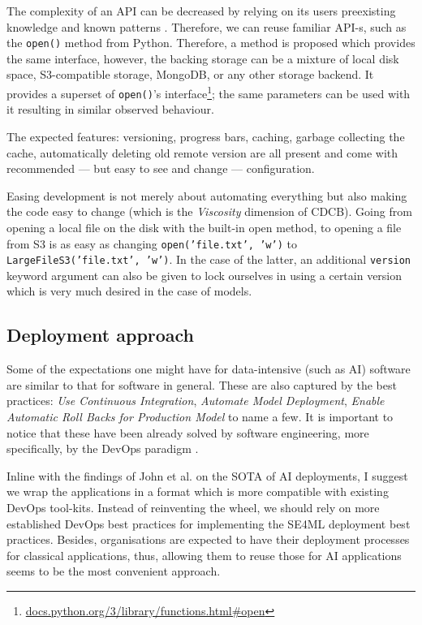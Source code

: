 The complexity of an API can be decreased by relying on its users preexisting knowledge and known patterns \cite{hermans2021programmer,ousterhout2018philosophy}. Therefore, we can reuse familiar API-s, such as the \texttt{open()} method from Python. Therefore, a method is proposed which provides the same interface, however, the backing storage can be a mixture of local disk space, S3-compatible storage, MongoDB, or any other storage backend. It provides a superset of \texttt{open()}'s interface\footnote{\href{https://docs.python.org/3/library/functions.html\#open}{docs.python.org/3/library/functions.html\#open}}; the same parameters can be used with it resulting in similar observed behaviour.

The expected features: versioning, progress bars, caching, garbage collecting the cache, automatically deleting old remote version are all present and come with recommended --- but easy to see and change --- configuration.

Easing development is not merely about automating everything but also making the code easy to change (which is the \textit{Viscosity} dimension of CDCB). Going from opening a local file on the disk with the built-in open method, to opening  a file from S3 is as easy as changing \texttt{open('file.txt', 'w')} to \texttt{LargeFileS3('file.txt', 'w')}. In the case of the latter, an additional \texttt{version} keyword argument can also be given to lock ourselves in using a certain version which is very much desired in the case of models.

\subsection{Deployment approach}

Some of the expectations one might have for data-intensive (such as AI) software are similar to that for software in general. These are also captured by the best practices: \textit{Use Continuous Integration}, \textit{Automate Model Deployment}, \textit{Enable Automatic Roll Backs for Production Model} to name a few. It is important to notice that these have been already solved by software engineering, more specifically, by the DevOps paradigm \cite{leite2019survey}. 

Inline with the findings of John et al. \cite{john2020architecting} on the SOTA of AI deployments, I suggest we wrap the applications in a format which is more compatible with existing DevOps tool-kits. Instead of reinventing the wheel, we should rely on more established DevOps best practices for implementing the SE4ML deployment best practices. Besides, organisations are expected to have their deployment processes for classical applications, thus, allowing them to reuse those for AI applications seems to be the most convenient approach.

